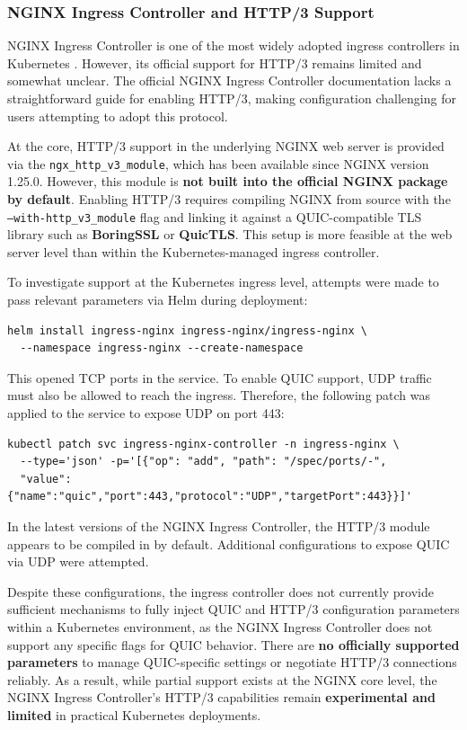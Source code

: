 \subsubsection{NGINX Ingress Controller and HTTP/3 Support}

NGINX Ingress Controller is one of the most widely adopted ingress controllers in Kubernetes \cite{nginx-ingress-docs}. However, its official support for HTTP/3 remains limited and somewhat unclear. The official NGINX Ingress Controller documentation lacks a straightforward guide for enabling HTTP/3, making configuration challenging for users attempting to adopt this protocol.

At the core, HTTP/3 support in the underlying NGINX web server is provided via the \texttt{ngx\_http\_v3\_module}, which has been available since NGINX version 1.25.0. However, this module is \textbf{not built into the official NGINX package by default}. Enabling HTTP/3 requires compiling NGINX from source with the \texttt{--with-http\_v3\_module} flag and linking it against a QUIC-compatible TLS library such as \textbf{BoringSSL} or \textbf{QuicTLS}. This setup is more feasible at the web server level than within the Kubernetes-managed ingress controller.

To investigate support at the Kubernetes ingress level, attempts were made to pass relevant parameters via Helm during deployment:

\begin{verbatim}
helm install ingress-nginx ingress-nginx/ingress-nginx \
  --namespace ingress-nginx --create-namespace
\end{verbatim}

This opened TCP ports in the service. To enable QUIC support, UDP traffic must also be allowed to reach the ingress. Therefore, the following patch was applied to the service to expose UDP on port 443:

\begin{verbatim}
kubectl patch svc ingress-nginx-controller -n ingress-nginx \
  --type='json' -p='[{"op": "add", "path": "/spec/ports/-", 
  "value": {"name":"quic","port":443,"protocol":"UDP","targetPort":443}}]'
\end{verbatim}

In the latest versions of the NGINX Ingress Controller, the HTTP/3 module appears to be compiled in by default. Additional configurations to expose QUIC via UDP were attempted.

Despite these configurations, the ingress controller does not currently provide sufficient mechanisms to fully inject QUIC and HTTP/3 configuration parameters within a Kubernetes environment, as the NGINX Ingress Controller does not support any specific flags for QUIC behavior. There are \textbf{no officially supported parameters} to manage QUIC-specific settings or negotiate HTTP/3 connections reliably. As a result, while partial support exists at the NGINX core level, the NGINX Ingress Controller's HTTP/3 capabilities remain \textbf{experimental and limited} in practical Kubernetes deployments.



